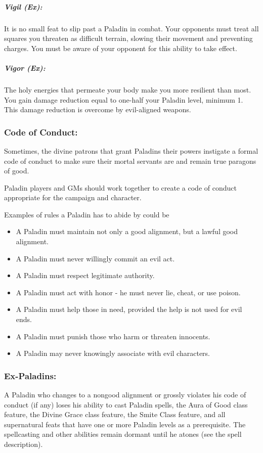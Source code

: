 \subparagraph{Vigil (Ex):}
It is no small feat to slip past a Paladin in combat. Your opponents must treat all squares you threaten as difficult terrain, slowing their movement and preventing charges. You must be aware of your opponent for this ability to take effect.

\subparagraph{Vigor (Ex):}
The holy energies that permeate your body make you more resilient than most. You gain damage reduction equal to one-half your Paladin level, minimum 1. This damage reduction is overcome by evil-aligned weapons.

\subsubsection{Code of Conduct:}
Sometimes, the divine patrons that grant Paladins their powers instigate a formal code of conduct to make sure their mortal servants are and remain true paragons of good.

Paladin players and GMs should work together to create a code of conduct appropriate for the campaign and character.

Examples of rules a Paladin has to abide by could be
\begin{itemize}
 \item A Paladin must maintain not only a good alignment, but a lawful good alignment.
 \item A Paladin must never willingly commit an evil act.
 \item A Paladin must respect legitimate authority.
 \item A Paladin must act with honor - he must never lie, cheat, or use poison.
 \item A Paladin must help those in need, provided the help is not used for evil ends.
 \item A Paladin must punish those who harm or threaten innocents.
 \item A Paladin may never knowingly associate with evil characters.
\end{itemize}
\subsubsection{Ex-Paladins:}
A Paladin who changes to a nongood alignment or grossly violates his code of conduct (if any) loses his ability to cast Paladin spells, the Aura of Good class feature, the Divine Grace class feature, the Smite Class feature, and all supernatural feats that have one or more Paladin levels as a prerequisite.
The spellcasting and other abilities remain dormant until he atones (see the  spell description).

